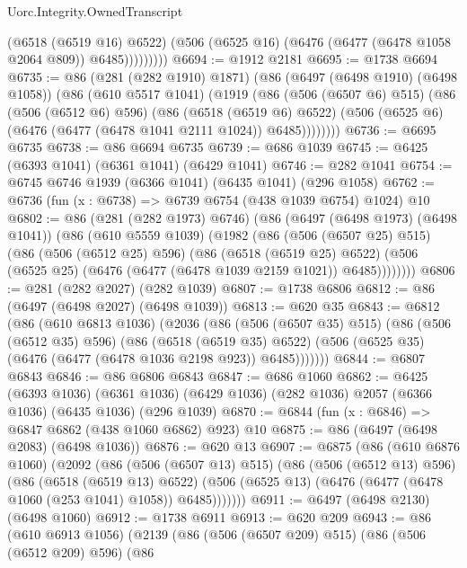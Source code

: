 \begin{lexlean}{Uorc.Integrity.OwnedTranscript}
\begin{coremodule}
                  (@6518 (@6519 @16) @6522)
                  (@506 (@6525 @16) (@6476 (@6477 (@6478 @1058 @2064 @809)) @6485)))))))))
@6694 := @1912 @2181
@6695 := @1738 @6694
@6735 := @86
    (@281 (@282 @1910) @1871)
    (@86
      (@6497 (@6498 @1910) (@6498 @1058))
      (@86
        (@610 @5517 @1041)
        (@1919
          (@86
            (@506 (@6507 @6) @515)
            (@86
              (@506 (@6512 @6) @596)
              (@86
                (@6518 (@6519 @6) @6522)
                (@506 (@6525 @6) (@6476 (@6477 (@6478 @1041 @2111 @1024)) @6485))))))))
@6736 := @6695 @6735
@6738 := @86 @6694 @6735
@6739 := @686 @1039
@6745 := @6425 (@6393 @1041) (@6361 @1041) (@6429 @1041)
@6746 := @282 @1041
@6754 := @6745 @6746 @1939 (@6366 @1041) (@6435 @1041) (@296 @1058)
@6762 := @6736 (fun (x : @6738) => @6739 @6754 (@438 @1039 @6754) @1024) @10
@6802 := @86
    (@281 (@282 @1973) @6746)
    (@86
      (@6497 (@6498 @1973) (@6498 @1041))
      (@86
        (@610 @5559 @1039)
        (@1982
          (@86
            (@506 (@6507 @25) @515)
            (@86
              (@506 (@6512 @25) @596)
              (@86
                (@6518 (@6519 @25) @6522)
                (@506 (@6525 @25) (@6476 (@6477 (@6478 @1039 @2159 @1021)) @6485))))))))
@6806 := @281 (@282 @2027) (@282 @1039)
@6807 := @1738 @6806
@6812 := @86 (@6497 (@6498 @2027) (@6498 @1039))
@6813 := @620 @35
@6843 := @6812
    (@86
      (@610 @6813 @1036)
      (@2036
        (@86
          (@506 (@6507 @35) @515)
          (@86
            (@506 (@6512 @35) @596)
            (@86
              (@6518 (@6519 @35) @6522)
              (@506 (@6525 @35) (@6476 (@6477 (@6478 @1036 @2198 @923)) @6485)))))))
@6844 := @6807 @6843
@6846 := @86 @6806 @6843
@6847 := @686 @1060
@6862 := @6425
    (@6393 @1036)
    (@6361 @1036)
    (@6429 @1036)
    (@282 @1036)
    @2057
    (@6366 @1036)
    (@6435 @1036)
    (@296 @1039)
@6870 := @6844 (fun (x : @6846) => @6847 @6862 (@438 @1060 @6862) @923) @10
@6875 := @86 (@6497 (@6498 @2083) (@6498 @1036))
@6876 := @620 @13
@6907 := @6875
    (@86
      (@610 @6876 @1060)
      (@2092
        (@86
          (@506 (@6507 @13) @515)
          (@86
            (@506 (@6512 @13) @596)
            (@86
              (@6518 (@6519 @13) @6522)
              (@506 (@6525 @13) (@6476 (@6477 (@6478 @1060 (@253 @1041) @1058)) @6485)))))))
@6911 := @6497 (@6498 @2130) (@6498 @1060)
@6912 := @1738 @6911
@6913 := @620 @209
@6943 := @86
    (@610 @6913 @1056)
    (@2139
      (@86
        (@506 (@6507 @209) @515)
        (@86
          (@506 (@6512 @209) @596)
          (@86

\end{coremodule}
\end{lexlean}
